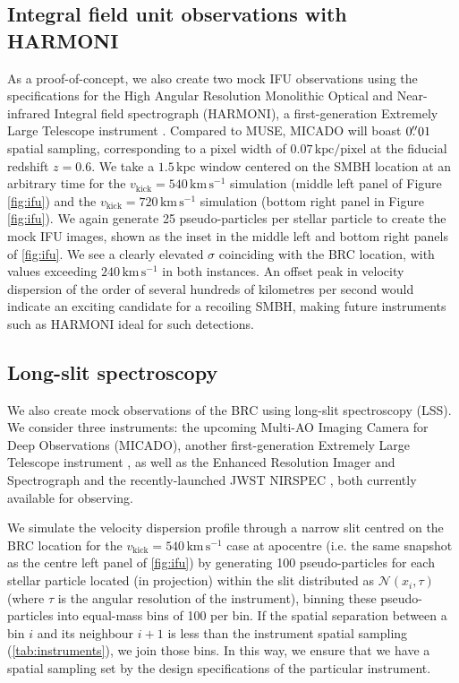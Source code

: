 \documentclass[twocolumn]{aastex631}
\newcommand{\kmps}{\ensuremath{\mathrm{km}\,\mathrm{s}^{-1}} }%
\newcommand{\vk}{\ensuremath{v_\mathrm{kick}}}                %
\begin{document}
\subsection{Integral field unit observations with HARMONI}\label{ssec:harmoni}
As a proof-of-concept, we also create two mock IFU observations using the specifications for the High Angular Resolution Monolithic Optical and Near-infrared Integral field spectrograph (HARMONI), a first-generation Extremely Large Telescope instrument \citep{thatte2010,thatte2016}.
Compared to MUSE, MICADO will boast $0\mbox{$.\!\!^{\prime\prime}$}01$ spatial sampling, corresponding to a pixel width of $0.07\,\mathrm{kpc}/\mathrm{pixel}$ at the fiducial redshift $z=0.6$.
We take a $1.5\,\mathrm{kpc}$ window centered on the SMBH location at an arbitrary time for the $\vk=540\,\kmps$ simulation (middle left panel of Figure \ref{fig:ifu}) and the $\vk=720\,\kmps$ simulation (bottom right panel in Figure \ref{fig:ifu}).
We again generate 25 pseudo-particles per stellar particle to create the mock IFU images, shown as the inset in the middle left and bottom right panels of \autoref{fig:ifu}.
We see a clearly elevated $\sigma$ coinciding with the BRC location, with values exceeding $240\,\kmps$ in both instances.
An offset peak in velocity dispersion of the order of several hundreds of kilometres per second would indicate an exciting candidate for a recoiling SMBH, making future instruments such as HARMONI ideal for such detections.

\subsection{Long-slit spectroscopy}
We also create mock observations of the BRC using long-slit spectroscopy (LSS).
We consider three instruments: the upcoming Multi-AO Imaging Camera for Deep Observations (MICADO), another first-generation Extremely Large Telescope instrument \citep{sturm2024}, as well as the Enhanced Resolution Imager and Spectrograph \cite[ERIS, mounted at the VLT, e.g.][]{davies2023} and the recently-launched JWST NIRSPEC \citep[e.g.][]{rieke2023}, both currently available for observing.

We simulate the velocity dispersion profile through a narrow slit centred on the BRC location for the $\vk=540\,\kmps$ case at apocentre (i.e. the same snapshot as the centre left panel of \autoref{fig:ifu}) by generating 100 pseudo-particles for each stellar particle located (in projection) within the slit distributed as $\mathcal{N}(x_i, \tau)$  (where $\tau$ is the angular resolution of the instrument), binning these pseudo-particles into equal-mass bins of 100 per bin.
If the spatial separation between a bin $i$ and its neighbour $i+1$ is less than the instrument spatial sampling (\autoref{tab:instruments}), we join those bins.
In this way, we ensure that we have a spatial sampling set by the design specifications of the particular instrument.
\end{document}
